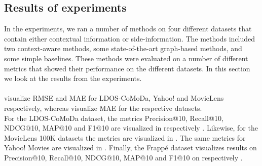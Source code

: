 \subsection{Results of experiments}\label{subsec:resultsofexperiment}
In the experiments, we ran a number of methods on four different datasets that contain either contextual information or side-information.
The methods included two context-aware methods, some state-of-the-art graph-based methods, and some simple baselines.
These methods were evaluated on a number of different metrics that showed their performance on the different datasets.
In this section we look at the results from the experiments.
\\\\
 visualize RMSE and MAE for LDOS-CoMoDa, Yahoo! and MovieLens respectively, whereas  visualize MAE for the respective datasets.\\
For the LDOS-CoMoDa dataset, the metrics Precision@10, Recall@10, NDCG@10, MAP@10 and F1@10 are visualized in respectively .
Likewise, for the MovieLens 100K datasets the metrics are visualized in .
The same metrics for Yahoo! Movies are visualized in .
Finally, the Frappé dataset visualizes results on Precision@10, Recall@10, NDCG@10, MAP@10 and F1@10 on respectively .

